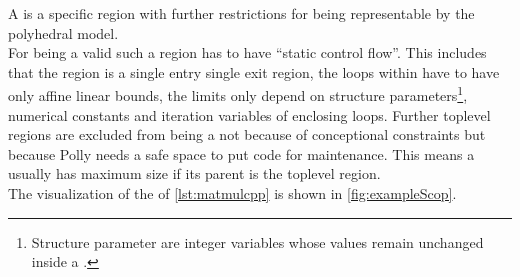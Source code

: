 A \scop is a specific region with further restrictions for being representable by the polyhedral model.\\
For being a valid \scop such a region has to have \enquote{static control flow}.
This includes that the region is a single entry single exit region, the loops within have to have only affine linear bounds, \eg the limits only depend on structure parameters\footnote{Structure parameter are integer variables whose values remain unchanged inside a \scop.}, numerical constants and iteration variables of enclosing loops. \cite{GanserIterativeSchedule, ScopDetection.cpp}
Further toplevel regions are excluded  from being a \scop not because of conceptional constraints but because Polly needs a safe space to put code for maintenance.
This means a \scop usually has maximum size if its parent is the toplevel region.\\
The visualization of the \scops of \autoref{lst:matmulcpp} is shown in \autoref{fig:exampleScop}.
